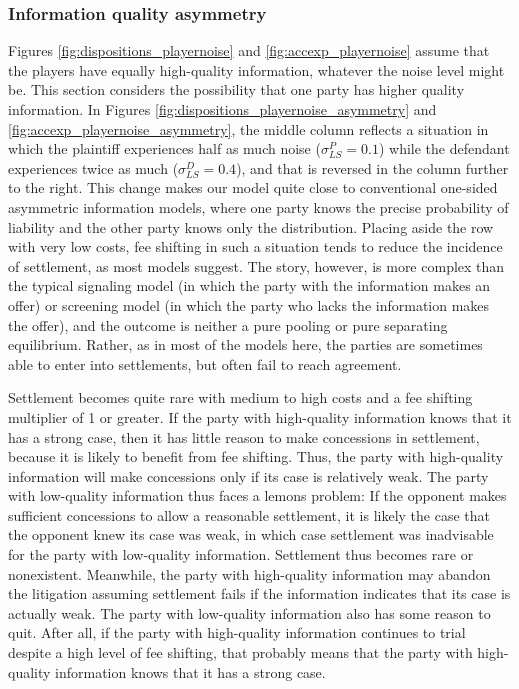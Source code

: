 \documentclass{article}
\begin{document}
\subsubsection{Information quality asymmetry}

Figures \ref{fig:dispositions_playernoise} and \ref{fig:accexp_playernoise} assume that the players have equally high-quality information, whatever the noise level might be. This section considers the possibility that one party has higher quality information. In Figures \ref{fig:dispositions_playernoise_asymmetry} and \ref{fig:accexp_playernoise_asymmetry}, the middle column reflects a situation in which the plaintiff experiences half as much noise ($\sigma_{LS}^P=0.1$) while the defendant experiences twice as much ($\sigma_{LS}^D=0.4$), and that is reversed in the column further to the right. This change makes our model quite close to conventional one-sided asymmetric information models, where one party knows the precise probability of liability and the other party knows only the distribution. Placing aside the row with very low costs, fee shifting in such a situation tends to reduce the incidence of settlement, as most models suggest. The story, however, is more complex than the typical signaling model (in which the party with the information makes an offer) or screening model (in which the party who lacks the information makes the offer), and the outcome is neither a pure pooling or pure separating equilibrium. Rather, as in most of the models here, the parties are sometimes able to enter into settlements, but often fail to reach agreement. 

Settlement becomes quite rare with medium to high costs and a fee shifting multiplier of 1 or greater. If the party with high-quality information knows that it has a strong case, then it has little reason to make concessions in settlement, because it is likely to benefit from fee shifting. Thus, the party with high-quality information will make concessions only if its case is relatively weak. The party with low-quality information thus faces a lemons problem: If the opponent makes sufficient concessions to allow a reasonable settlement, it is likely the case that the opponent knew its case was weak, in which case settlement was inadvisable for the party with low-quality information. Settlement thus becomes rare or nonexistent. Meanwhile, the party with high-quality information may abandon the litigation assuming settlement fails if the information indicates that its case is actually weak. The party with low-quality information also has some reason to quit. After all, if the party with high-quality information continues to trial despite a high level of fee shifting, that probably means that the party with high-quality information knows that it has a strong case. 
\end{document}
